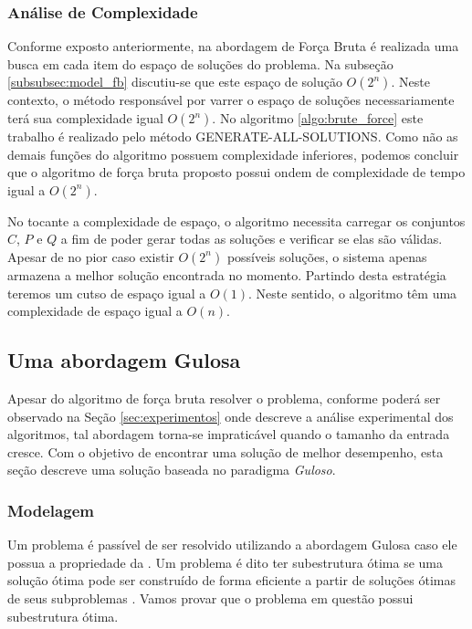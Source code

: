 \documentclass[12pt]{article}
\begin{document}
\subsubsection{Análise de Complexidade}
\label{subsubsec:fb_analise_complexidade}

Conforme exposto anteriormente, na abordagem de Força Bruta é realizada uma busca em cada item do espaço de soluções do problema. Na subseção \ref{subsubsec:model_fb} discutiu-se que este espaço de solução $O(2^{n})$. Neste contexto, o método responsável por varrer o espaço de soluções necessariamente terá sua complexidade igual $O(2^{n})$. No algoritmo \ref{algo:brute_force} este trabalho é realizado pelo método \textsc{GENERATE-ALL-SOLUTIONS}{}. Como não as demais funções do algoritmo possuem complexidade inferiores, podemos concluir que o algoritmo de força bruta proposto possui ondem de complexidade de tempo igual a $O(2^{n})$.

No tocante a complexidade de espaço, o algoritmo necessita carregar os conjuntos $C$, $P$ e $Q$ a fim de poder gerar todas as soluções e verificar se elas são válidas. Apesar de no pior caso existir $O(2^{n})$ possíveis soluções, o sistema apenas armazena a melhor solução encontrada no momento. Partindo desta estratégia teremos um cutso de espaço igual a $O(1)$. Neste sentido, o algoritmo têm uma complexidade de espaço igual a $O(n)${}.

\subsection{Uma abordagem Gulosa}
\label{subsec:guloso}

Apesar do algoritmo de força bruta resolver o problema, conforme poderá ser observado na Seção \ref{sec:experimentos} onde descreve a análise experimental dos algoritmos, tal abordagem torna-se impraticável quando o tamanho da entrada cresce. Com o objetivo de encontrar uma solução de melhor desempenho, esta seção descreve uma solução baseada no paradigma \textit{Guloso}.

\subsubsection{Modelagem}
\label{subsubsec:model_guloso}
Um problema é passível de ser resolvido utilizando a abordagem Gulosa caso ele possua a propriedade da . Um problema é dito ter subestrutura ótima se uma solução ótima pode ser construído de forma eficiente a partir de soluções ótimas de seus subproblemas \cite{Cormen:2009:IAT:1614191}{}. Vamos provar que o problema em  questão possui subestrutura ótima.
\end{document}
